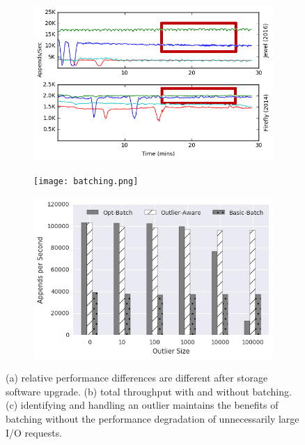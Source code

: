 \begin{figure}[t]
    \centering
    \begin{subfigure}[b]{.30\linewidth}
        \centering
        \includegraphics[width=1.0\linewidth]{jewel_v_firefly_pd.png}
        \caption{}
        \label{fig:phy-design}
    \end{subfigure}
    \begin{subfigure}[b]{.30\linewidth}
        \centering
        \texttt{[image: batching.png]}
        \caption{}
        \label{fig:batching}
    \end{subfigure}
    \begin{subfigure}[b]{.30\linewidth}
        \centering
        \includegraphics[width=1.0\linewidth]{batching-outlier-detect.png}
        \caption{}
        \label{fig:batching-outlier}
    \end{subfigure}
    \caption{(a) relative performance differences are different after storage
    software upgrade. (b) total throughput with and without batching. (c)
    identifying and handling an outlier maintains the benefits
    of batching without the performance degradation of unnecessarily large I/O
    requests.}
\end{figure}

